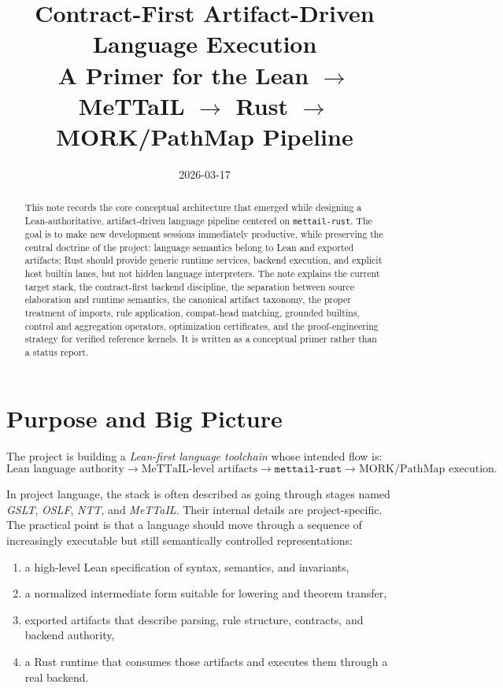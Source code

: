 \documentclass[11pt]{article}
\title{Contract-First Artifact-Driven Language Execution\\
\large A Primer for the Lean $\to$ MeTTaIL $\to$ Rust $\to$ MORK/PathMap Pipeline}
\author{}
\date{2026-03-17}
\begin{document}
\maketitle

\begin{abstract}
This note records the core conceptual architecture that emerged while designing a Lean-authoritative, artifact-driven language pipeline centered on \texttt{mettail-rust}. The goal is to make new development sessions immediately productive, while preserving the central doctrine of the project: language semantics belong to Lean and exported artifacts; Rust should provide generic runtime services, backend execution, and explicit host builtin lanes, but not hidden language interpreters. The note explains the current target stack, the contract-first backend discipline, the separation between source elaboration and runtime semantics, the canonical artifact taxonomy, the proper treatment of imports, rule application, compat-head matching, grounded builtins, control and aggregation operators, optimization certificates, and the proof-engineering strategy for verified reference kernels. It is written as a conceptual primer rather than a status report.
\end{abstract}

\tableofcontents

\section{Purpose and Big Picture}

The project is building a \emph{Lean-first language toolchain} whose intended flow is:
\[
\text{Lean language authority} \to \text{MeTTaIL-level artifacts} \to \texttt{mettail-rust} \to \text{MORK/PathMap execution.}
\]

In project language, the stack is often described as going through stages named \emph{GSLT}, \emph{OSLF}, \emph{NTT}, and \emph{MeTTaIL}. Their internal details are project-specific. The practical point is that a language should move through a sequence of increasingly executable but still semantically controlled representations:
\begin{enumerate}
  \item a high-level Lean specification of syntax, semantics, and invariants,
  \item a normalized intermediate form suitable for lowering and theorem transfer,
  \item exported artifacts that describe parsing, rule structure, contracts, and backend authority,
  \item a Rust runtime that consumes those artifacts and executes them through a real backend.
\end{enumerate}
\end{document}
